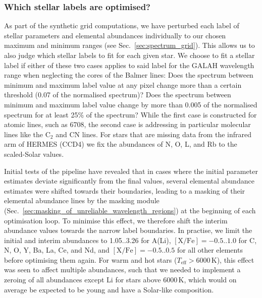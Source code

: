 \documentclass[
  journal=pasa,
  manuscript=research-paper, %
  year=2024,
  volume=37
]{cup-journal}
\newcommand\ion[2]{\text{#1\,\textsc{\lowercase{#2}}}}	%
\newcommand{\K}{\,\mathrm{K}}	%
\begin{document}
\subsubsection{Which stellar labels are optimised?} \label{sec:which_labels_are_optimised}


As part of the synthetic grid computations, we have perturbed each label of stellar parameters and elemental abundances individually to our chosen maximum and minimum ranges (see Sec.~\ref{sec:spectrum_grid}). This allows us to also judge which stellar labels to fit for each given star. We choose to fit a stellar label if either of these two cases applies to said label for the GALAH wavelength range when neglecting the cores of the Balmer lines: Does the spectrum between minimum and maximum label value at any pixel change more than a certain threshold (0.07 of the normalised spectrum)? Does the spectrum between minimum and maximum label value change by more than 0.005 of the normalised spectrum for at least 25\% of the spectrum? While the first case is constructed for atomic lines, such as \ion{Li}{i} 6708, the second case is addressing in particular molecular lines like the $\mathrm{C_2}$ and $\mathrm{CN}$ lines. For stars that are missing data from the infrared arm of HERMES (CCD4) we fix the abundances of N, O, L, and Rb to the scaled-Solar values.

Initial tests of the pipeline have revealed that in cases where the initial parameter estimates deviate significantly from the final values, several elemental abundance estimates were shifted towards their boundaries, leading to a masking of their elemental abundance lines by the masking module (Sec.~\ref{sec:masking_of_unreliable_wavelength_regions}) at the beginning of each optimisation loop. To minimise this effect, we therefore shift the interim abundance values towards the narrow label boundaries. In practise, we limit the initial and interim abundances to 1.05..3.26 for A(Li), $\mathrm{[X/Fe]} = -0.5..1.0$ for C, N, O, Y, Ba, La, Ce, and Nd, and $\mathrm{[X/Fe]} = -0.5..0.5$ for all other elements before optimising them again. For warm and hot stars ($T_\text{eff} > 6000\K$), this effect was seen to affect multiple abundances, such that we needed to implement a zeroing of all abundances except Li for stars above $6000\K$, which would on average be expected to be young and have a Solar-like composition.
\end{document}
